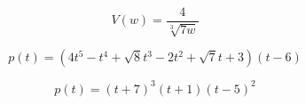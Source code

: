 \documentclass{ximera}
\begin{document}
\begin{example}
\begin{question}
\begin{multipleChoice}
\end{multipleChoice}


\end{question}










\begin{question}


\[
V(w) = \frac{4}{\sqrt[3]{7w}}
\]

\begin{multipleChoice}
\end{multipleChoice}


\end{question}













\begin{question}


\[
p(t) = (4t^5 - t^4 + \sqrt{8} t^3 - 2t^2 + \sqrt{7} t + 3)(t-6)
\]

\begin{multipleChoice}
\end{multipleChoice}


\end{question}









\begin{question}


\[
p(t) = (t+7)^3 (t+1) (t-5)^2
\]

\begin{multipleChoice}
\end{multipleChoice}


\end{question}













\end{example}
\end{document}
